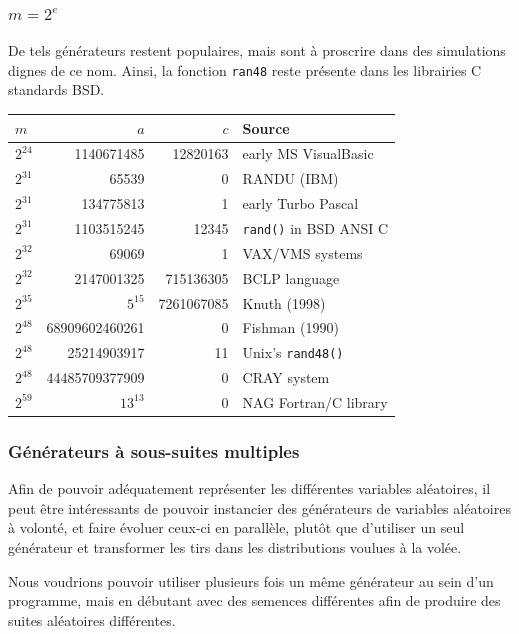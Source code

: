 \documentclass[t,usepdftitle=false]{beamer}
\begin{document}
\begin{frame}[fragile]
\frametitle{$m=2^e$}

De tels générateurs restent populaires, mais sont à proscrire dans
des simulations dignes de ce nom.
Ainsi, la fonction \verb|ran48| reste présente dans les librairies C standards BSD.

\begin{small}
\begin {center}
\begin {tabular}{|l|r|r|l|}
\hline
 \phantom{12} $m$  & $a$ \phantom{12345}  & $c$\phantom{1234} & \phantom{12345} Source \\
\hline
 $2^{24}$    & 1140671485 & 12820163 & early MS VisualBasic \\
 $2^{31}$    &     65539  &    0  & RANDU (IBM) \\
 $2^{31}$    & 134775813  &    1  & early Turbo Pascal \\
 $2^{31}$    & 1103515245 & 12345 & {\tt rand()} in BSD ANSI C \\
 $2^{32}$    &     69069  &    1  & VAX/VMS systems \\ %
 $2^{32}$    & 2147001325 & 715136305  & BCLP language \\
 $2^{35}$    & $5^{15}$   & 7261067085 & Knuth (1998) \\
 $2^{48}$    & 68909602460261 &     0  & Fishman (1990) \\
 $2^{48}$    &    25214903917 &    11  & Unix's {\tt rand48()}  \\
 $2^{48}$    & 44485709377909 &     0  & CRAY system \\ %
 $2^{59}$    &  $13^{13}$     &     0  & NAG Fortran/C library  \\
\hline
\end {tabular}
\end {center}
\end{small}

\end{frame}

\begin{frame}
\frametitle{Générateurs à sous-suites multiples}

Afin de pouvoir adéquatement représenter les différentes variables aléatoires, il peut être intéressants de pouvoir instancier des générateurs de variables aléatoires à volonté, et faire évoluer ceux-ci en parallèle, plutôt que d'utiliser un seul générateur et transformer les tirs dans les distributions voulues à la volée.

\mbox{}

Nous voudrions pouvoir utiliser plusieurs fois un même générateur au sein d'un programme, mais en débutant avec des semences différentes afin de produire des suites aléatoires différentes.

\end{frame}
\end{document}
